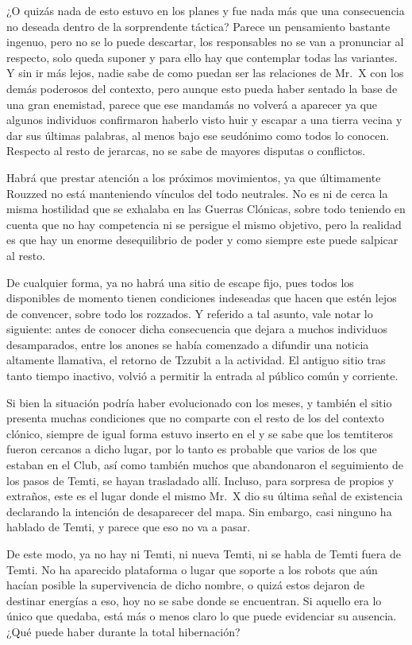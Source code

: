 \documentclass[
  spanish,
]{book}
\begin{document}
¿O quizás nada de esto estuvo en los planes y fue nada más que una consecuencia no deseada dentro de la sorprendente táctica?
Parece un pensamiento bastante ingenuo, pero no se lo puede descartar, los responsables no se van a pronunciar al respecto, solo queda suponer y para ello hay que contemplar todas las variantes. Y sin ir más lejos, nadie sabe de como puedan ser las relaciones de Mr.~X con los demás poderosos del contexto, pero aunque esto pueda haber sentado la base de una gran enemistad, parece que ese mandamás no volverá a aparecer ya que algunos individuos confirmaron haberlo visto huir y escapar a una tierra vecina y dar sus últimas palabras, al menos bajo ese seudónimo como todos lo conocen.
Respecto al resto de jerarcas, no se sabe de mayores disputas o conflictos.

Habrá que prestar atención a los próximos movimientos, ya que últimamente Rouzzed no está manteniendo vínculos del todo neutrales. No es ni de cerca la misma hostilidad que se exhalaba en las Guerras Clónicas, sobre todo teniendo en cuenta que no hay competencia ni se persigue el mismo objetivo, pero la realidad es que hay un enorme desequilibrio de poder y como siempre este puede salpicar al resto.

De cualquier forma, ya no habrá una sitio de escape fijo, pues todos los disponibles de momento tienen condiciones indeseadas que hacen que estén lejos de convencer, sobre todo los rozzados.
Y referido a tal asunto, vale notar lo siguiente: antes de conocer dicha consecuencia que dejara a muchos individuos desamparados, entre los anones se había comenzado a difundir una noticia altamente llamativa, el retorno de Tzzubit a la actividad. El antiguo sitio tras tanto tiempo inactivo, volvió a permitir la entrada al público común y corriente.

Si bien la situación podría haber evolucionado con los meses, y también el sitio presenta muchas condiciones que no comparte con el resto de los del contexto clónico, siempre de igual forma estuvo inserto en el y se sabe que los temtiteros fueron cercanos a dicho lugar, por lo tanto es probable que varios de los que estaban en el Club, así como también muchos que abandonaron el seguimiento de los pasos de Temti, se hayan trasladado allí. Incluso, para sorpresa de propios y extraños, este es el lugar donde el mismo Mr.~X dio su última señal de existencia declarando la intención de desaparecer del mapa. Sin embargo, casi ninguno ha hablado de Temti, y parece que eso no va a pasar.

De este modo, ya no hay ni Temti, ni nueva Temti, ni se habla de Temti fuera de Temti.
No ha aparecido plataforma o lugar que soporte a los robots que aún hacían posible la supervivencia de dicho nombre, o quizá estos dejaron de destinar energías a eso, hoy no se sabe donde se encuentran. Si aquello era lo único que quedaba, está más o menos claro lo que puede evidenciar su ausencia. ¿Qué puede haber durante la total hibernación?
\end{document}
